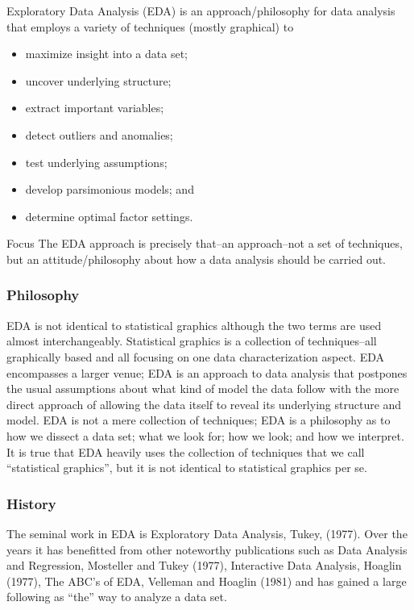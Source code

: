 \documentclass[]{book}
\providecommand{\tightlist}{%
  \setlength{\itemsep}{0pt}\setlength{\parskip}{0pt}}
\theoremstyle{definition}
\theoremstyle{definition}
\theoremstyle{definition}
\theoremstyle{remark}
\begin{document}
Exploratory Data Analysis (EDA) is an approach/philosophy for data
analysis that employs a variety of techniques (mostly graphical) to

\begin{itemize}
\tightlist
\item
  maximize insight into a data set;
\item
  uncover underlying structure;
\item
  extract important variables;
\item
  detect outliers and anomalies;
\item
  test underlying assumptions;
\item
  develop parsimonious models; and
\item
  determine optimal factor settings.
\end{itemize}

Focus The EDA approach is precisely that--an approach--not a set of
techniques, but an attitude/philosophy about how a data analysis should
be carried out.

\subsubsection{Philosophy}\label{philosophy}

EDA is not identical to statistical graphics although the two terms are
used almost interchangeably. Statistical graphics is a collection of
techniques--all graphically based and all focusing on one data
characterization aspect. EDA encompasses a larger venue; EDA is an
approach to data analysis that postpones the usual assumptions about
what kind of model the data follow with the more direct approach of
allowing the data itself to reveal its underlying structure and model.
EDA is not a mere collection of techniques; EDA is a philosophy as to
how we dissect a data set; what we look for; how we look; and how we
interpret. It is true that EDA heavily uses the collection of techniques
that we call ``statistical graphics'', but it is not identical to
statistical graphics per se.

\subsubsection{History}\label{history}

The seminal work in EDA is Exploratory Data Analysis, Tukey, (1977).
Over the years it has benefitted from other noteworthy publications such
as Data Analysis and Regression, Mosteller and Tukey (1977), Interactive
Data Analysis, Hoaglin (1977), The ABC's of EDA, Velleman and Hoaglin
(1981) and has gained a large following as ``the'' way to analyze a data
set.
\end{document}
